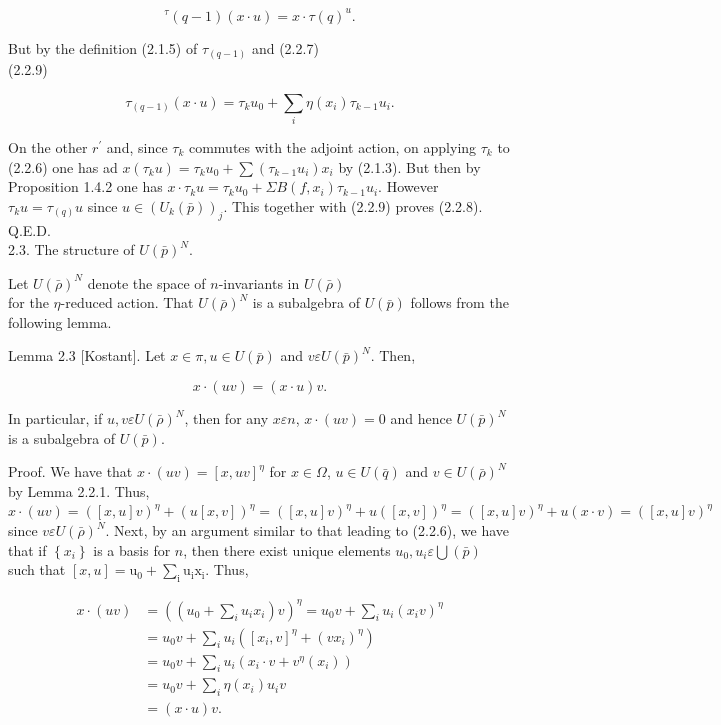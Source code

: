 \documentclass[10pt]{article}
\begin{document}
$$
{ }^{\tau}(q-1)(x \cdot u)=x \cdot \tau(q)^{u} .
$$

But by the definition (2.1.5) of $\tau_{(q-1)}$ and (2.2.7)\\
(2.2.9)

$$
\tau_{(q-1)}(x \cdot u)=\tau_{k} u_{0}+\sum_{i} \eta\left(x_{i}\right) \tau_{k-1} u_{i} .
$$

On the other $r^{\prime}$ and, since $\tau_{k}$ commutes with the adjoint action, on applying $\tau_{k}$ to (2.2.6) one has ad $x\left(\tau_{k} u\right)=\tau_{k} u_{0}+\sum\left(\tau_{k-1} u_{i}\right) x_{i}$ by (2.1.3). But then by Proposition 1.4.2 one has $x \cdot \tau_{k} u=\tau_{k} u_{0}+\Sigma B\left(f, x_{i}\right) \tau_{k-1} u_{i}$. However $\tau_{k} u=\tau_{(q)} u$ since $u \in\left(U_{k}(\bar{p})\right)_{j}$. This together with (2.2.9) proves (2.2.8).\\
Q.E.D.\\
2.3. The structure of $U(\bar{p})^{N}$.

Let $U(\bar{\rho})^{N}$ denote the space of $n$-invariants in $U(\bar{\rho})$\\
for the $\eta$-reduced action. That $U(\bar{\rho})^{N}$ is a subalgebra of $U(\bar{p})$ follows from the following lemma.

Lemma 2.3 [Kostant]. Let $x \in \pi, u \in U(\bar{p})$ and $v \varepsilon U(\bar{p})^{N}$. Then,


\begin{equation*}
x \cdot(u v)=(x \cdot u) v . \tag{2.3.1}
\end{equation*}


In particular, if $u, v \varepsilon U(\bar{\rho})^{N}$, then for any $x \varepsilon n$, $x \cdot(u v)=0$ and hence $U(\bar{p})^{N}$ is a subalgebra of $U(\bar{p})$.

Proof. We have that $x \cdot(u v)=[x, u v]^{\eta}$ for $x \in \Omega$, $u \in U(\bar{q})$ and $v \in U(\bar{\rho})^{N}$ by Lemma 2.2.1. Thus, $x \cdot(u v)=([x, u] v)^{\eta}+(u[x, v])^{\eta}=([x, u] v)^{\eta}+u([x, v])^{\eta}= ([x, u] v)^{\eta}+u(x \cdot v)=([x, u] v)^{\eta}$ since $v \varepsilon U(\bar{\rho})^{N}$. Next, by an argument similar to that leading to (2.2.6), we have that if $\left\{x_{i}\right\}$ is a basis for $n$, then there exist unique elements $u_{0}, u_{i} \varepsilon \bigcup(\bar{p})$ such that $[x, u]= \mathrm{u}_{0}+\sum_{\mathrm{i}} \mathrm{u}_{\mathrm{i}} \mathrm{x}_{\mathrm{i}}$. Thus,

$$
\begin{aligned}
x \cdot(u v) & =\left(\left(u_{0}+\sum_{i} u_{i} x_{i}\right) v\right)^{\eta}=u_{0} v+\sum_{i} u_{i}\left(x_{i} v\right)^{\eta} \\
& =u_{0} v+\sum_{i} u_{i}\left(\left[x_{i}, v\right]^{\eta}+\left(v x_{i}\right)^{\eta}\right) \\
& =u_{0} v+\sum_{i} u_{i}\left(x_{i} \cdot v+v^{\eta}\left(x_{i}\right)\right) \\
& =u_{0} v+\sum_{i} \eta\left(x_{i}\right) u_{i} v \\
& =(x \cdot u) v .
\end{aligned}
$$
\end{document}
